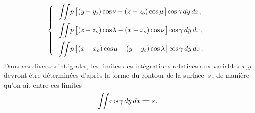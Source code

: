 \documentclass[11pt, twoside, leqno]{article}
\newcommand\equals{\scalebox{1.5}[1]{$=$}}
\newcommand\cosine{\operatorname{cos} \hspace{-0.1ex}}
\begin{document}
\begin{equation}\label{integrales.3}
\left\{\;\begin{array}{l}
\displaystyle\iint \! p \, \bigl[\hspace{.1ex} (y - y_{\hspace{-0.14ex}o}) \cosine \nu - (z - z_o) \cosine \mu \hspace{.2ex}\bigr] \cosine \gamma \, dy \, dx \hspace{.4ex} \text{,}
\\[1em]
\displaystyle\iint \! p \, \bigl[\hspace{.1ex} (z - z_o) \cosine \lambda - (x - x_o) \cosine \nu \hspace{.2ex}\bigr] \cosine \gamma \, dy \, dx \hspace{.4ex} \text{,}
\\[1em]
\displaystyle\iint \! p \, \bigl[\hspace{.1ex} (x - x_o) \cosine \mu - (y - y_{\hspace{-0.14ex}o}) \cosine \lambda \hspace{.2ex}\bigr] \cosine \gamma \, dy \, dx \hspace{.4ex} \text{.}
\end{array}\right.
\end{equation}
Dans ces diverses intégrales, les limites des intégrations relatives aux variables \hbox{\;$x$,\:$y$\;} devront être déterminées d'après la forme du contour de la surface~\;$s$\,,\hspace{.5ex} de manière qu'on ait entre ces limites
\begin{equation}
\displaystyle\iint \! \cosine \gamma \, dy \, dx \hspace{.6ex} \equals \hspace{.5ex} s
\hspace{.3ex} \text{.}
\end{equation}
\end{document}
